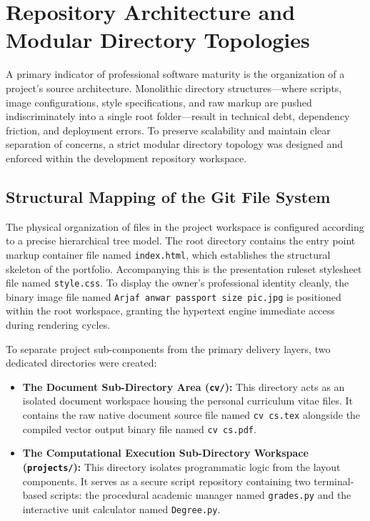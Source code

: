 \documentclass[12pt,a4paper]{article}
\begin{document}
\section{Repository Architecture and Modular Directory Topologies}
A primary indicator of professional software maturity is the organization of a project's source architecture. Monolithic directory structures—where scripts, image configurations, style specifications, and raw markup are pushed indiscriminately into a single root folder—result in technical debt, dependency friction, and deployment errors. To preserve scalability and maintain clear separation of concerns, a strict modular directory topology was designed and enforced within the development repository workspace.

\subsection{Structural Mapping of the Git File System}
The physical organization of files in the project workspace is configured according to a precise hierarchical tree model. The root directory contains the entry point markup container file named \texttt{index.html}, which establishes the structural skeleton of the portfolio. Accompanying this is the presentation ruleset stylesheet file named \texttt{style.css}. To display the owner's professional identity cleanly, the binary image file named \texttt{Arjaf anwar passport size pic.jpg} is positioned within the root workspace, granting the hypertext engine immediate access during rendering cycles.

To separate project sub-components from the primary delivery layers, two dedicated directories were created:
\begin{itemize}
    \item \textbf{The Document Sub-Directory Area (\texttt{cv/}):} This directory acts as an isolated document workspace housing the personal curriculum vitae files. It contains the raw native document source file named \texttt{cv cs.tex} alongside the compiled vector output binary file named \texttt{cv cs.pdf}.
    \item \textbf{The Computational Execution Sub-Directory Workspace (\texttt{projects/}):} This directory isolates programmatic logic from the layout components. It serves as a secure script repository containing two terminal-based scripts: the procedural academic manager named \texttt{grades.py} and the interactive unit calculator named \texttt{Degree.py}.
\end{itemize}
\end{document}
